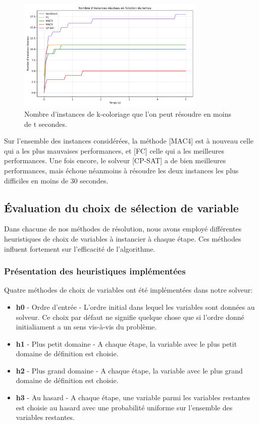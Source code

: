 \documentclass[14pt]{article}
\begin{document}
\begin{figure}[H]
	\centering
	\includegraphics[width=0.8\textwidth]{Images/coloring1.png}
	\caption{Nombre d'instances de k-coloriage que l'on peut résoudre en moins de t secondes.}
	\label{fig:coloring1}
\end{figure}

Sur l'ensemble des instances considérées, la méthode [MAC4] est à nouveau celle qui a les plus mauvaises performances, et [FC] celle qui a les meilleures performances. Une fois encore, le solveur [CP-SAT] a de bien meilleures performances, mais échoue néanmoins à résoudre les deux instances les plus difficiles en moins de 30 secondes.

\subsection{Évaluation du choix de sélection de variable}

Dans chacune de nos méthodes de résolution, nous avons employé différentes heuristiques de choix de variables à instancier à chaque étape. Ces méthodes influent fortement sur l'efficacité de l'algorithme.

\subsubsection{Présentation des heuristiques implémentées}

Quatre méthodes de choix de variables ont été implémentées dans notre solveur:
\begin{itemize}
    \item \textbf{h0} - Ordre d'entrée - L'ordre initial dans lequel les variables sont données au solveur. Ce choix par défaut ne signifie quelque chose que si l'ordre donné initialiament a un sens vis-à-vis du problème.
    \item \textbf{h1} - Plus petit domaine - A chaque étape, la variable avec le plus petit domaine de définition est choisie.
    \item \textbf{h2} - Plus grand domaine - A chaque étape, la variable avec le plus grand domaine de définition est choisie.
    \item \textbf{h3} - Au hasard - A chaque étape, une variable parmi les variables restantes est choisie au hasard avec une probabilité uniforme sur l'ensemble des variables restantes.
\end{itemize}
\end{document}
